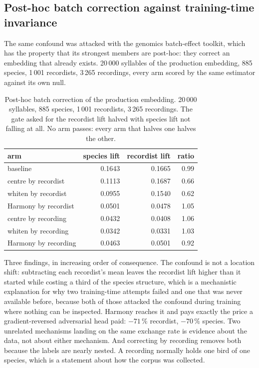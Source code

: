 \documentclass[10pt,twocolumn,a4paper]{article}
\begin{document}
\subsection{Post-hoc batch correction against training-time invariance}

The same confound was attacked with the genomics batch-effect toolkit, which has the property
that its strongest members are post-hoc: they correct an embedding that already exists.
20\,000 syllables of the production embedding, 885 species, 1\,001 recordists, 3\,265
recordings, every arm scored by the same estimator against its own null.

\begin{table}[t]
\centering
\small
\caption{Post-hoc batch correction of the production embedding. 20\,000 syllables, 885
species, 1\,001 recordists, 3\,265 recordings. The gate asked for the recordist lift halved
with species lift not falling at all. No arm passes: every arm that halves one halves the
other.}
\label{tab:batch}
\begin{tabular}{L{5.6cm} r r r}
\toprule
arm & species lift & recordist lift & ratio \\
\midrule
baseline & 0.1643 & 0.1665 & 0.99 \\
centre by recordist & 0.1113 & 0.1687 & 0.66 \\
whiten by recordist & 0.0955 & 0.1540 & 0.62 \\
Harmony by recordist & 0.0501 & 0.0478 & 1.05 \\
centre by recording & 0.0432 & 0.0408 & 1.06 \\
whiten by recording & 0.0342 & 0.0331 & 1.03 \\
Harmony by recording & 0.0463 & 0.0501 & 0.92 \\
\bottomrule
\end{tabular}
\end{table}

Three findings, in increasing order of consequence. The confound is not a location shift:
subtracting each recordist's mean leaves the recordist lift higher than it started while
costing a third of the species structure, which is a mechanistic explanation for why two
training-time attempts failed and one that was never available before, because both of those
attacked the confound during training where nothing can be inspected. Harmony
\citep{korsunsky2019} reaches it and pays exactly the price a gradient-reversed adversarial
head paid: $-71\,\%$ recordist, $-70\,\%$ species. Two unrelated mechanisms landing on the
same exchange rate is evidence about the data, not about either mechanism. And
correcting by recording removes both because the labels are nearly nested. A recording
normally holds one bird of one species, which is a statement about how the corpus was
collected.
\end{document}
